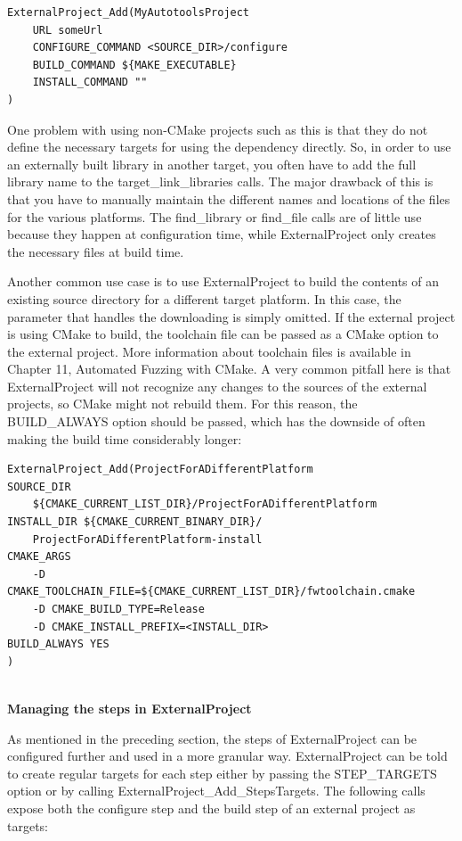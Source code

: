 \begin{lstlisting}[style=styleCMake]
ExternalProject_Add(MyAutotoolsProject
	URL someUrl
	CONFIGURE_COMMAND <SOURCE_DIR>/configure
	BUILD_COMMAND ${MAKE_EXECUTABLE}
	INSTALL_COMMAND ""
)
\end{lstlisting}

One problem with using non-CMake projects such as this is that they do not define the necessary targets for using the dependency directly. So, in order to use an externally built library in another target, you often have to add the full library name to the target\_link\_libraries calls. The major drawback of this is that you have to manually maintain the different names and locations of the files for the various platforms. The find\_library or find\_file calls are of little use because they happen at configuration time, while ExternalProject only creates the necessary files at build time.

Another common use case is to use ExternalProject to build the contents of an existing source directory for a different target platform. In this case, the parameter that handles the downloading is simply omitted. If the external project is using CMake to build, the toolchain file can be passed as a CMake option to the external project. More information about toolchain files is available in Chapter 11, Automated Fuzzing with CMake. A very common pitfall here is that ExternalProject will not recognize any changes to the sources of the external projects, so CMake might not rebuild them. For this reason, the BUILD\_ALWAYS option should be passed, which has the downside of often making the build time considerably longer:

\begin{lstlisting}[style=styleCMake]
ExternalProject_Add(ProjectForADifferentPlatform
SOURCE_DIR 
	${CMAKE_CURRENT_LIST_DIR}/ProjectForADifferentPlatform
INSTALL_DIR ${CMAKE_CURRENT_BINARY_DIR}/
	ProjectForADifferentPlatform-install
CMAKE_ARGS
	-D CMAKE_TOOLCHAIN_FILE=${CMAKE_CURRENT_LIST_DIR}/fwtoolchain.cmake
	-D CMAKE_BUILD_TYPE=Release
	-D CMAKE_INSTALL_PREFIX=<INSTALL_DIR>
BUILD_ALWAYS YES
)
\end{lstlisting}

\hspace*{\fill} \\ %
\noindent
\textbf{Managing the steps in ExternalProject}

As mentioned in the preceding section, the steps of ExternalProject can be configured further and used in a more granular way. ExternalProject can be told to create regular targets for each step either by passing the STEP\_TARGETS option or by calling ExternalProject\_Add\_StepsTargets. The following calls expose both the configure step and the build step of an external project as targets:

